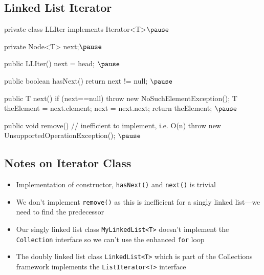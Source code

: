 \begin{slide}
\section[-1.5]{Linked List Iterator}

\begin{PauseHighLight}
\begin{java}
    private class LLIter implements Iterator<T>$\pause$
    {
        private Node<T> next;$\pause$

        public LLIter() { next = head; }$\pause$

        public boolean hasNext() { return next != null; }$\pause$

        public T next() {
            if (next==null)
                throw new NoSuchElementException();
            T theElement = next.element;
            next = next.next;
            return theElement;
        }$\pause$

        public void remove() { // inefficient to implement, i.e. O(n)
            throw new UnsupportedOperationException();
        }$\pause$
    }
\end{java}
\end{PauseHighLight}

\end{slide}


\begin{slide}
\section[-1]{Notes on Iterator Class}

\begin{PauseHighLight}
  \begin{itemize}
  \item Implementation of constructor, \texttt{hasNext()} and
    \texttt{next()} is trivial\pause
  \item We don't implement \texttt{remove()} as this is inefficient for a
    singly linked list---we need to find the predecessor\pause
  \item Our singly linked list class \texttt{MyLinkedList<T>} doesn't
    implement the \texttt{Collection} interface so we can't use the
    enhanced \texttt{for} loop\pause
  \item The doubly linked list class \texttt{LinkedList<T>} which is part
    of the Collections framework implements the \texttt{ListIterator<T>}
    interface\pause
  \end{itemize}
\end{PauseHighLight}

\end{slide}

